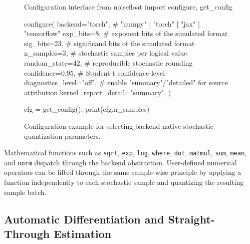 \documentclass[manuscript, screen]{acmart}
\begin{document}
\begin{figure}[t]
\centering
\begin{pythoncode}[label={lst:configuration}]{Configuration interface}
from noisefloat import configure, get_config

configure(
    backend="torch",          # "numpy" | "torch" | "jax" | "tensorflow"
    exp_bits=8,               # exponent bits of the simulated format
    sig_bits=23,              # significand bits of the simulated format
    n_samples=3,              # stochastic samples per logical value
    random_state=42,          # reproducible stochastic rounding
    confidence=0.95,          # Student-t confidence level
    diagnostics_level="off", # enable "summary"/"detailed" for source attribution
    kernel_report_detail="summary",
)

cfg = get_config(); print(cfg.n_samples)
\end{pythoncode}
\caption{Configuration example for selecting backend-native stochastic quantization parameters.}
\end{figure}

Mathematical functions such as \texttt{sqrt}, \texttt{exp}, \texttt{log}, \texttt{where}, \texttt{dot}, \texttt{matmul}, \texttt{sum}, \texttt{mean}, and \texttt{norm} dispatch through the backend abstraction. User-defined numerical operators can be lifted through the same sample-wise principle by applying a function independently to each stochastic sample and quantizing the resulting sample batch.

\subsection{Automatic Differentiation and Straight-Through Estimation}
\end{document}
